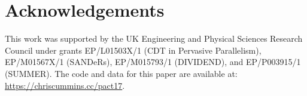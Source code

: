\section*{Acknowledgements}

This work was supported by the UK Engineering and Physical Sciences Research
Council under grants EP/L01503X/1 (CDT in Pervasive Parallelism), EP/M01567X/1
(SANDeRs), EP/M015793/1 (DIVIDEND), and EP/P003915/1 (SUMMER). The code and data
for this paper are available at: \url{https://chriscummins.cc/pact17}.
